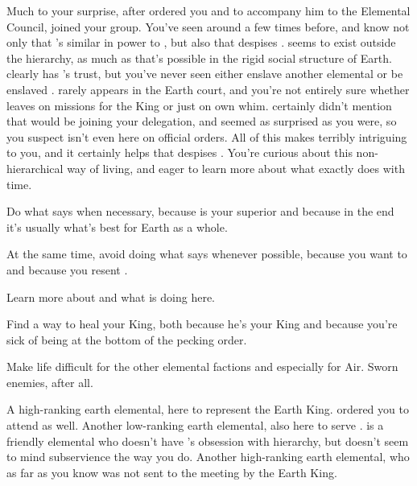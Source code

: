 \documentclass[char]{elementals}
\begin{document}
Much to your surprise, after \cLoyal{} ordered you and \cMinion{} to accompany him to the Elemental Council, \cRogue{\intro} joined your group.  You've seen \cRogue{\them} around a few times before, and know not only that \cRogue{\they}'s similar in power to \cLoyal{}, but also that \cLoyal{} despises \cRogue{\them}.  \cRogue{} seems to exist outside the hierarchy, as much as that's possible in the rigid social structure of Earth.  \cRogue{\They} clearly has \cEarthKing{}'s trust, but you've never seen \cRogue{\them} either enslave another elemental or be enslaved \cRogue{\themself}.  \cRogue{} rarely appears in the Earth court, and you're not entirely sure whether \cRogue{\they} leaves on missions for the King or just on \cRogue{\their} own whim.  \cEarthKing{} certainly didn't mention that \cRogue{} would be joining your delegation, and \cLoyal{} seemed as surprised as you were, so you suspect \cRogue{} isn't even here on official orders.  All of this makes \cRogue{} terribly intriguing to you, and it certainly helps that \cLoyal{} despises \cRogue{\them}.  You're curious about this non-hierarchical way of living, and eager to learn more about what exactly \cRogue{} does with \cRogue{\their} time.

\begin{itemz}[Goals]
	\item  Do what \cLoyal{} says when necessary, because \cLoyal{\they} is your superior and because in the end it's usually what's best for Earth as a whole.
	\item  At the same time, avoid doing what \cLoyal{} says whenever possible, because you want to and because you resent \cLoyal{\them}.
	\item  Learn more about \cRogue{} and what \cRogue{\they} is doing here.
  \item  Find a way to heal your King, both because he's your King and because you're sick of being at the bottom of the pecking order.
	\item  Make life difficult for the other elemental factions and especially for Air.  Sworn enemies, after all.
\end{itemz}

\begin{contacts}
  \contact{\cLoyal{\intro}} A high-ranking earth elemental, here to represent the Earth King.  \cLoyal{\They} ordered you to attend as well.
	\contact{\cMinion{\intro}} Another low-ranking earth elemental, also here to serve \cLoyal{}.  \cMinion{} is a friendly elemental who doesn't have \cLoyal{}'s obsession with hierarchy, but doesn't seem to mind subservience the way you do.
	\contact{\cRogue{\intro}} Another high-ranking earth elemental, who as far as you know was not sent to the meeting by the Earth King.
\end{contacts} 
\end{document}
